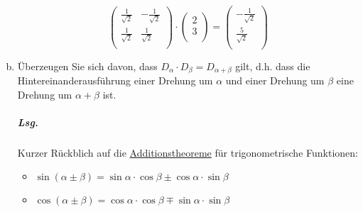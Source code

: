 \documentclass{scrreprt}
\begin{document}
\begin{enumerate}[(a)]
  \begin{minipage}{.45\textwidth}
    \[
      \begin{pmatrix}
        \frac{1}{\sqrt{2}} & -\frac{1}{\sqrt{2}} \\
        \frac{1}{\sqrt{2}} & \frac{1}{\sqrt{2}}  \\
      \end{pmatrix} \cdot \begin{pmatrix}
        2 \\
        3 \\
      \end{pmatrix} = \begin{pmatrix}
        -\frac{1}{\sqrt{2}} \\
        \frac{5}{\sqrt{2}} \\
      \end{pmatrix}
    \]
  \end{minipage}
  \begin{minipage}{.45\textwidth}
  \end{minipage}

\newpage
\item Überzeugen Sie sich davon, dass
  $D_{\alpha} \cdot D_{\beta} = D_{\alpha + \beta}$ gilt, d.h. dass die
  Hintereinanderausführung einer Drehung um $\alpha$ und einer Drehung um $\beta$
  eine Drehung um $\alpha + \beta$ ist.

  \subparagraph{Lsg.} Kurzer Rückblich auf die
  \href{https://de.wikipedia.org/wiki/Formelsammlung_Trigonometrie#Additionstheoreme}{Additionstheoreme}
  für trigonometrische Funktionen:
  \begin{itemize}
  \item $\sin(\alpha \pm \beta) = \sin\alpha\cdot\cos\beta \pm \cos\alpha\cdot\sin\beta$
  \item $\cos(\alpha \pm \beta) = \cos\alpha\cdot\cos\beta \mp \sin\alpha\cdot\sin\beta$
  \end{itemize}


\end{enumerate}
\end{document}
